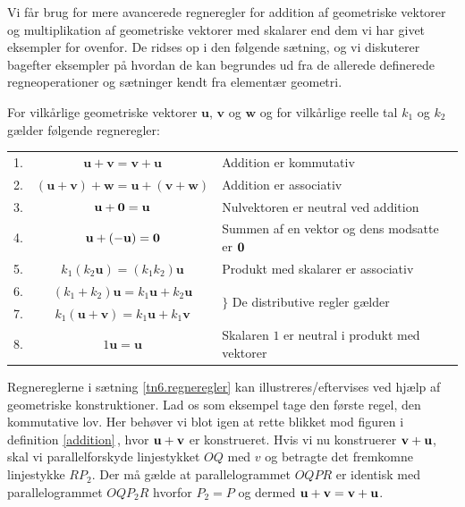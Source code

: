 Vi får brug for mere avancerede regneregler for addition af geometriske vektorer og multiplikation af geometriske vektorer med skalarer end dem vi har givet eksempler for ovenfor. De ridses op i den følgende sætning, og vi diskuterer bagefter eksempler på hvordan de kan begrundes ud fra de allerede definerede regneoperationer og sætninger kendt fra elementær geometri.\bs

\begin{theorem}[Regneregler] \label{tn6.regneregler}
For vilkårlige geometriske vektorer $ \mathbf u $, $ \mathbf v $ og $ \mathbf w $ og for vilkårlige reelle tal $ k_1 $ og $ k_2 $ gælder følgende regneregler: \smallskip \\
\begin{tabular}{lcl}
1. & $ \mathbf u + \mathbf v = \mathbf v + \mathbf u $ & Addition er kommutativ \smallskip \\
2. & $ (\mathbf u + \mathbf v ) + \mathbf w = \mathbf u + (\mathbf v + \mathbf w) $ & Addition er associativ \smallskip \\
3. & $ \mathbf u + \bm{0} = \mathbf u $ & Nulvektoren er neutral ved addition \smallskip  \\
4. & $ \mathbf u + (-\mathbf u) = \bm{0} $ & Summen af en vektor og dens modsatte er $\bm{0}$ \smallskip \\
5. & $ k_1(k_2\mathbf u) = (k_1k_2)\mathbf u $ & Produkt med skalarer er associativ \smallskip \\
6. & $ (k_1 + k_2)\mathbf u = k_1\mathbf u + k_2\mathbf u $ & \multirow{2}{10cm}{$\biggr\rbrace$ De distributive regler gælder} \smallskip \\
7. & $ k_1(\mathbf u+\mathbf v) = k_1\mathbf u+ k_1 \mathbf v $ &  \smallskip  \\
8. & $ 1\mathbf u = \mathbf u $ & Skalaren $ 1 $ er neutral i produkt med vektorer \\
\end{tabular}
\end{theorem}

Regnereglerne i sætning \ref{tn6.regneregler} kan illustreres/eftervises ved hjælp af geometriske konstruktioner. Lad os som eksempel tage den første regel, den kommutative lov. Her behøver vi blot igen at rette blikket mod figuren i definition \ref{addition}\,, hvor $\mathbf u+\mathbf{v}$ er konstrueret. Hvis vi nu konstruerer $\mathbf{v}+\mathbf u$, skal vi  parallelforskyde linjestykket $OQ$ med $v$ og betragte det fremkomne linjestykke $RP_2$. Der må gælde at parallelogrammet $OQPR$ er identisk med parallelogrammet $OQP_2R$ hvorfor $P_2=P$ og dermed $\mathbf u+\mathbf{v}=\mathbf{v}+\mathbf u$.\\

